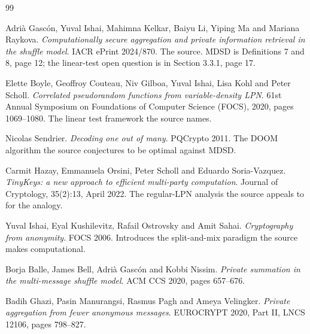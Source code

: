 \documentclass{aicr-conjecture}
\begin{document}
\begin{aicrbibliography}{99}

Adri\`a Gasc\'on, Yuval Ishai, Mahimna Kelkar, Baiyu Li, Yiping Ma and
Mariana Raykova.
\emph{Computationally secure aggregation and private information
retrieval in the shuffle model}.
IACR ePrint 2024/870.
The source. MDSD is Definitions 7 and 8, page 12; the linear-test open
question is in Section 3.3.1, page 17.

Elette Boyle, Geoffroy Couteau, Niv Gilboa, Yuval Ishai, Lisa Kohl and
Peter Scholl.
\emph{Correlated pseudorandom functions from variable-density LPN}.
61st Annual Symposium on Foundations of Computer Science (FOCS), 2020,
pages 1069--1080.
The linear test framework the source names.

Nicolas Sendrier.
\emph{Decoding one out of many}.
PQCrypto 2011.
The DOOM algorithm the source conjectures to be optimal against MDSD\@.

Carmit Hazay, Emmanuela Orsini, Peter Scholl and Eduardo Soria-Vazquez.
\emph{TinyKeys: a new approach to efficient multi-party computation}.
Journal of Cryptology, 35(2):13, April 2022.
The regular-LPN analysis the source appeals to for the analogy.

Yuval Ishai, Eyal Kushilevitz, Rafail Ostrovsky and Amit Sahai.
\emph{Cryptography from anonymity}.
FOCS 2006.
Introduces the split-and-mix paradigm the source makes computational.

Borja Balle, James Bell, Adri\`a Gasc\'on and Kobbi Nissim.
\emph{Private summation in the multi-message shuffle model}.
ACM CCS 2020, pages 657--676.

Badih Ghazi, Pasin Manurangsi, Rasmus Pagh and Ameya Velingker.
\emph{Private aggregation from fewer anonymous messages}.
EUROCRYPT 2020, Part II, LNCS 12106, pages 798--827.

\end{aicrbibliography}
\end{document}
